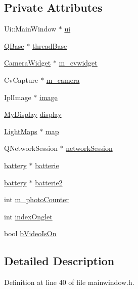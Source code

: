 \subsection*{Private Attributes}
\begin{DoxyCompactItemize}
\item 
Ui\-::\-Main\-Window $\ast$ \hyperlink{classMainWindow_a35466a70ed47252a0191168126a352a5}{ui}
\item 
\hyperlink{classQBase}{Q\-Base} $\ast$ \hyperlink{classMainWindow_aa35075e5c401c08057511b93444701cf}{thread\-Base}
\item 
\hyperlink{classCameraWidget}{Camera\-Widget} $\ast$ \hyperlink{classMainWindow_a3225ace47a46792151d14646b6429712}{m\-\_\-cvwidget}
\item 
Cv\-Capture $\ast$ \hyperlink{classMainWindow_a1e4ee7611df9ee764de50cd2bfdebc55}{m\-\_\-camera}
\item 
Ipl\-Image $\ast$ \hyperlink{classMainWindow_aeb45155a2035daf28097e853724529a1}{image}
\item 
\hyperlink{classMyDisplay}{My\-Display} \hyperlink{classMainWindow_a144a0c272b675a9e8721ee486d629874}{display}
\item 
\hyperlink{classLightMaps}{Light\-Maps} $\ast$ \hyperlink{classMainWindow_a2f9e7ca90c2813bd1969055871782cfb}{map}
\item 
Q\-Network\-Session $\ast$ \hyperlink{classMainWindow_a638a10aec0de799787205387ee4da83e}{network\-Session}
\item 
\hyperlink{classbattery}{battery} $\ast$ \hyperlink{classMainWindow_af02a0259f044a5b2a1feabffccbc227e}{batterie}
\item 
\hyperlink{classbattery}{battery} $\ast$ \hyperlink{classMainWindow_a2c5aa6244af6d3e2018b98f285b0b84a}{batterie2}
\item 
int \hyperlink{classMainWindow_a264802533d4b55dce30d220ba9559471}{m\-\_\-photo\-Counter}
\item 
int \hyperlink{classMainWindow_a2cf797221c17fdcce7888b123bd5847b}{index\-Onglet}
\item 
bool \hyperlink{classMainWindow_a8f36c27c20d39c3f0eafe091b9f2cf29}{b\-Video\-Is\-On}
\end{DoxyCompactItemize}


\subsection{Detailed Description}


Definition at line 40 of file mainwindow.\-h.



